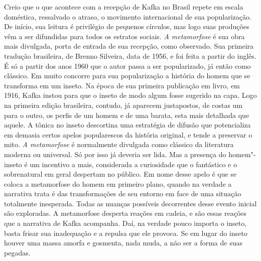 Creio que o que acontece com a recepção de Kafka no Brasil repete em
escala doméstica, ressalvado o atraso, o movimento internacional de sua
popularização. De início, sua leitura é privilégio de pequenos círculos,
mas logo suas produções vêm a ser difundidas para todos os estratos
sociais. \textit{A metamorfose} é sua obra mais divulgada, porta de
entrada de sua recepção, como observado. Sua primeira tradução
brasileira, de Brenno Silveira, data de 1956, e foi feita a partir do inglês. É só
a partir dos anos 1960 que o autor passa a ser popularizado, já
então como clássico. Em muito concorre para sua popularização a
história do homem que se transforma em um inseto. Na época de sua
primeira publicação em livro, em 1916, Kafka instou para que o inseto
de modo algum fosse sugerido na capa. Logo na primeira edição
brasileira, contudo, já aparecem justapostos, de costas um para o
outro, os perfis de um homem e de uma barata, esta mais detalhada que
aquele. A tônica no inseto descortina uma estratégia de difusão que
potencializa em demasia certos apelos popularescos da história
original, e tende a preservar o mito. \textit{A metamorfose} é
normalmente divulgada como clássico da literatura moderna ou universal.
Só por isso já deveria ser lida. Mas a presença do homem"-inseto é um
incentivo a mais, considerada a curiosidade que o fantástico e o
sobrenatural em geral despertam no público. Em nome desse apelo é que
se coloca a metamorfose do homem em primeiro plano, quando na verdade a
narrativa trata é das transformações de seu entorno em face de uma
situação totalmente inesperada. Todas as nuanças possíveis decorrentes
desse evento inicial são exploradas. A metamorfose desperta reações em
cadeia, e são essas reações que a narrativa de Kafka acompanha. Daí, na
verdade pouco importa o inseto, basta frisar sua inadequação e a
repulsa que ele provoca. Se em lugar do inseto houver uma massa amorfa
e gosmenta, nada muda, a não ser a forma de suas pegadas.

